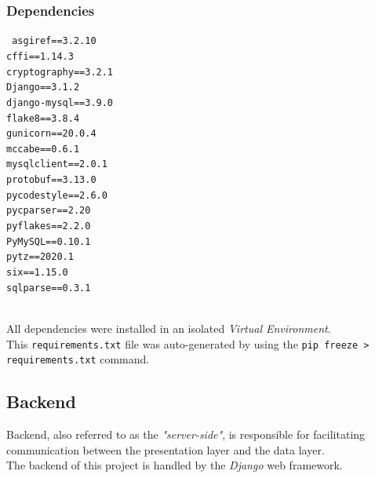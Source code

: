 \documentclass[12pt, a4paper]{report}
\newcommand{\code}[1]{\colorbox{light-gray}{\texttt{#1}}}
\begin{document}
    \subsubsection{Dependencies}
    \texttt{%
    asgiref==3.2.10 \\
    cffi==1.14.3 \\
    cryptography==3.2.1 \\
    Django==3.1.2 \\
    django-mysql==3.9.0 \\
    flake8==3.8.4 \\
    gunicorn==20.0.4 \\
    mccabe==0.6.1 \\
    mysqlclient==2.0.1 \\
    protobuf==3.13.0 \\
    pycodestyle==2.6.0 \\
    pycparser==2.20 \\
    pyflakes==2.2.0 \\
    PyMySQL==0.10.1 \\
    pytz==2020.1 \\
    six==1.15.0 \\
    sqlparse==0.3.1 \\
    }
    \\
    \begin{footnotesize}
    All dependencies were installed in an isolated \emph{Virtual Environment}.\\
    This \verb|requirements.txt| file was auto-generated by using the \code{pip freeze > requirements.txt} command. 
    \end{footnotesize}
    
    \subsection{Backend}
    Backend, also referred to as the \emph{"server-side"}, is responsible for facilitating communication between the presentation layer and the data layer.\\
    The backend of this project is handled by the \emph{Django} web framework.\\
\end{document}
